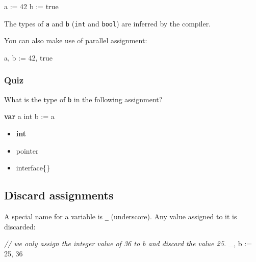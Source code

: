 \documentclass[]{book}
\newenvironment{Shaded}{\begin{snugshade}}{\end{snugshade}}
\newcommand{\CommentTok}[1]{\textcolor[rgb]{0.56,0.35,0.01}{\textit{#1}}}
\newcommand{\DataTypeTok}[1]{\textcolor[rgb]{0.13,0.29,0.53}{#1}}
\newcommand{\DecValTok}[1]{\textcolor[rgb]{0.00,0.00,0.81}{#1}}
\newcommand{\KeywordTok}[1]{\textcolor[rgb]{0.13,0.29,0.53}{\textbf{#1}}}
\newcommand{\NormalTok}[1]{#1}
\newcommand{\OtherTok}[1]{\textcolor[rgb]{0.56,0.35,0.01}{#1}}
\providecommand{\tightlist}{%
  \setlength{\itemsep}{0pt}\setlength{\parskip}{0pt}}
\let\BeginKnitrBlock\begin \let\EndKnitrBlock\end
\begin{document}
\begin{Shaded}
\begin{Highlighting}[]
\NormalTok{a := }\DecValTok{42}
\NormalTok{b := }\OtherTok{true}
\end{Highlighting}
\end{Shaded}

\BeginKnitrBlock{rmdnote}
The types of \texttt{a} and \texttt{b} (\texttt{int} and \texttt{bool}) are inferred by the compiler.
\EndKnitrBlock{rmdnote}

You can also make use of parallel assignment:

\begin{Shaded}
\begin{Highlighting}[]
\NormalTok{a, b := }\DecValTok{42}\NormalTok{, }\OtherTok{true}
\end{Highlighting}
\end{Shaded}

\hypertarget{quiz-10}{%
\subsubsection*{Quiz}\label{quiz-10}}

What is the type of \texttt{b} in the following assignment?

\begin{Shaded}
\begin{Highlighting}[]
\KeywordTok{var}\NormalTok{ a }\DataTypeTok{int}
\NormalTok{b := a}
\end{Highlighting}
\end{Shaded}

\begin{itemize}
\tightlist
\item
  \textbf{int}
\item
  pointer
\item
  interface\{\}
\end{itemize}

\hypertarget{discard-assignments}{%
\subsection{Discard assignments}\label{discard-assignments}}

A special name for a variable is \texttt{\_} (underscore). Any value assigned to it is
discarded:

\begin{Shaded}
\begin{Highlighting}[]
\CommentTok{// we only assign the integer value of 36 to b and discard the value 25.}
\NormalTok{_, b := }\DecValTok{25}\NormalTok{, }\DecValTok{36}
\end{Highlighting}
\end{Shaded}
\end{document}

